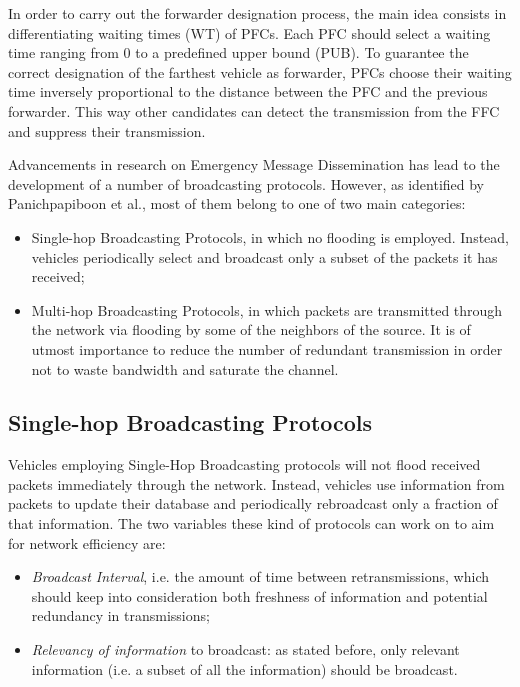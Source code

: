 		
		In order to carry out the forwarder designation process, the main idea consists in differentiating waiting times (WT) of PFCs. Each PFC should select a waiting time ranging from 0 to a predefined upper bound (PUB). To guarantee the correct designation of the farthest vehicle as forwarder, PFCs choose their waiting time inversely proportional to the distance between the PFC and the previous forwarder. This way other candidates can detect the transmission from the FFC and suppress their transmission.
		
		Advancements in research on Emergency Message Dissemination has lead to the development of a number of broadcasting protocols. However, as identified by Panichpapiboon et al.\cite{5989903}, most of them belong to one of two main categories:
		\begin{itemize}
			\item Single-hop Broadcasting Protocols, in which no flooding is employed. Instead, vehicles periodically select and broadcast only a subset of the packets it has received;
			\item Multi-hop Broadcasting Protocols, in which packets are transmitted through the network via flooding by some of the neighbors of the source. It is of utmost importance to reduce the number of redundant transmission in order not to waste bandwidth and saturate the channel.
		\end{itemize}
		
			\subsection{Single-hop Broadcasting Protocols}
		
		Vehicles employing Single-Hop Broadcasting protocols will not flood received packets immediately through the network. Instead, vehicles use information from packets to update their database and periodically rebroadcast only a fraction of that information. The two variables these kind of protocols can work on to aim for network efficiency are:
		\begin{itemize}
			\item \textit{Broadcast Interval}, i.e. the amount of time between retransmissions, which should keep into consideration both freshness of information and potential redundancy in transmissions;
			\item \textit{Relevancy of information} to broadcast: as stated before, only relevant information (i.e. a subset of all the information) should be broadcast.
		\end{itemize}
		

